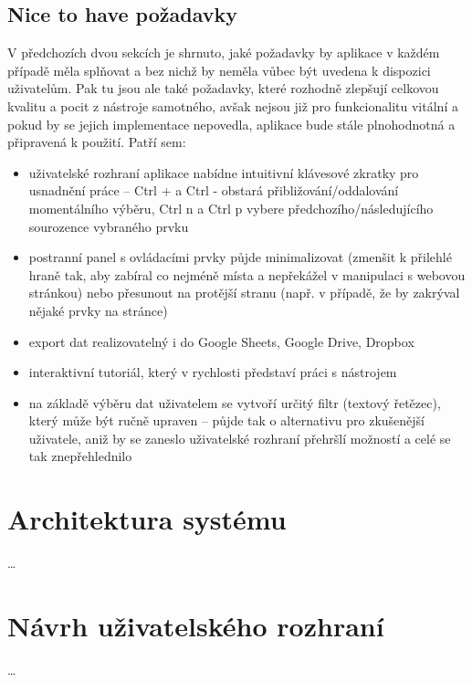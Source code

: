 \documentclass[thesis=B,czech]{FITthesis}[2012/06/26]
\begin{document}
\subsection{Nice to have požadavky}
V předchozích dvou sekcích je shrnuto, jaké požadavky by aplikace v každém případě měla splňovat a bez nichž by neměla vůbec být uvedena k dispozici uživatelům. Pak tu jsou ale také požadavky, které rozhodně zlepšují celkovou kvalitu a pocit z nástroje samotného, avšak nejsou již pro funkcionalitu vitální a pokud by se jejich implementace nepovedla, aplikace bude stále plnohodnotná a připravená k použití. Patří sem:
\begin{itemize}
	\item uživatelské rozhraní aplikace nabídne intuitivní klávesové zkratky pro usnadnění práce -- \textsf{Ctrl +} a \textsf{Ctrl -} obstará přibližování/oddalování momentálního výběru, \textsf{Ctrl n} a \textsf{Ctrl p} vybere předchozího/následujícího sourozence vybraného prvku
	\item postranní panel s ovládacími prvky půjde minimalizovat (zmenšit k přilehlé hraně tak, aby zabíral co nejméně místa a nepřekážel v manipulaci s webovou stránkou) nebo přesunout na protější stranu (např. v případě, že by zakrýval nějaké prvky na stránce)
	\item export dat realizovatelný i do Google Sheets, Google Drive, Dropbox
	\item interaktivní tutoriál, který v rychlosti představí práci s nástrojem
	\item na základě výběru dat uživatelem se vytvoří určitý filtr (textový řetězec), který může být ručně upraven -- půjde tak o alternativu pro zkušenější uživatele, aniž by se zaneslo uživatelské rozhraní přehršlí možností a celé se tak znepřehlednilo
\end{itemize}


\section{Architektura systému}
\dots


\section{Návrh uživatelského rozhraní}
\dots
\end{document}
